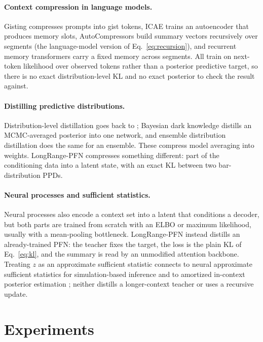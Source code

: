 \documentclass[11pt]{article}
\begin{document}
\paragraph{Context compression in language models.} Gisting
\citep{mu2023gisting} compresses prompts into gist tokens, ICAE
\citep{ge2023icae} trains an autoencoder that produces memory slots,
AutoCompressors \citep{chevalier2023autocompressors} build summary vectors
recursively over segments (the language-model version of
Eq.~\eqref{eq:recursion}), and recurrent memory transformers
\citep{bulatov2022rmt} carry a fixed memory across segments. All train on
next-token likelihood over observed tokens rather than a posterior
predictive target, so there is no exact distribution-level KL and no exact
posterior to check the result against.

\paragraph{Distilling predictive distributions.} Distribution-level
distillation goes back to \citet{hinton2015distillation}; Bayesian dark
knowledge \citep{korattikara2015darkknowledge} distills an MCMC-averaged
posterior into one network, and ensemble distribution distillation
\citep{malinin2020edd} does the same for an ensemble. These compress model
averaging into weights. LongRange-PFN compresses something different: part
of the conditioning data into a latent state, with an exact KL between two
bar-distribution PPDs.

\paragraph{Neural processes and sufficient statistics.} Neural processes
\citep{garnelo2018np, kim2019anp} also encode a context set into a latent
that conditions a decoder, but both parts are trained from scratch with an
ELBO or maximum likelihood, usually with a mean-pooling bottleneck.
LongRange-PFN instead distills an already-trained PFN: the teacher fixes
the target, the loss is the plain KL of Eq.~\eqref{eq:kl}, and the summary
is read by an unmodified attention backbone. Treating $z$ as an approximate
sufficient statistic connects to neural approximate sufficient statistics
for simulation-based inference \citep{chen2021nass} and to amortized
in-context posterior estimation \citep{mittal2025amortized}; neither
distills a longer-context teacher or uses a recursive update.

\section{Experiments}
\label{sec:experiments}
\end{document}
